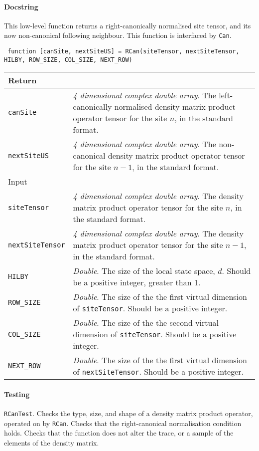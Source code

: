  \paragraph{Docstring} This low-level function returns a right-canonically normalised site tensor, and its now non-canonical following neighbour. This function is interfaced by \lstinline$Can$.
 \begin{lstlisting}
 function [canSite, nextSiteUS] = RCan(siteTensor, nextSiteTensor, HILBY, ROW_SIZE, COL_SIZE, NEXT_ROW) \end{lstlisting}
 \begin{longtabu}{X[1,l]X[4,l]}
 \hline
 Return & \\ \hline
 \lstinline$canSite$ & \emph{4 dimensional complex double array}. The left-canonically normalised density matrix product operator tensor for the site \(n\), in the standard format. \\
 \lstinline$nextSiteUS$ & \emph{4 dimensional complex double array}. The non-canonical density matrix product operator tensor for the site \(n-1\), in the standard format. \\ \hline
 Input & \\ \hline
 \lstinline$siteTensor$ & \emph{4 dimensional complex double array}. The density matrix product operator tensor for the site \(n\), in the standard format. \\
 \lstinline$nextSiteTensor$ & \emph{4 dimensional complex double array}. The density matrix product operator tensor for the site \(n-1\), in the standard format. \\
 \lstinline$HILBY$ & \emph{Double}. The size of the local state space, \(d\). Should be a positive integer, greater than 1. \\
 \lstinline$ROW_SIZE$ & \emph{Double}. The size of the the first virtual dimension of \lstinline$siteTensor$. Should be a positive integer.  \\
 \lstinline$COL_SIZE$ & \emph{Double}. The size of the the second virtual dimension of \lstinline$siteTensor$. Should be a positive integer. \\
 \lstinline$NEXT_ROW$ & \emph{Double}. The size of the the first virtual dimension of \lstinline$nextSiteTensor$. Should be a positive integer. \\
 \hline
 \end{longtabu}
 \paragraph{Testing} \lstinline$RCanTest$. Checks the type, size, and shape of a density matrix product operator, operated on by \lstinline$RCan$. Checks that the right-canonical normalisation condition holds. Checks that the function does not alter the trace, or a sample of the elements of the density matrix.

